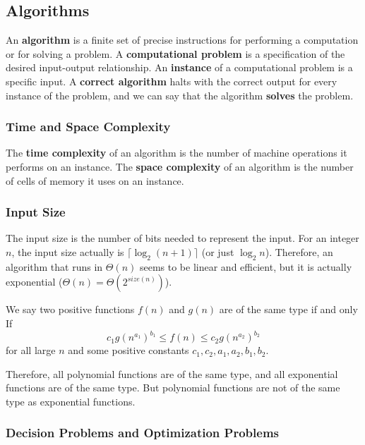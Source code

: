 \documentclass[a4paper,12pt]{article}
\begin{document}
\subsection{Algorithms}

An \textbf{algorithm} is a finite set of precise instructions for performing a computation or for solving a problem.
A \textbf{computational problem} is a specification of the desired input-output relationship.
An \textbf{instance} of a computational problem is a specific input.
A \textbf{correct algorithm} halts with the correct output for every instance of the problem, and we can say that the algorithm \textbf{solves} the problem.

\subsubsection{Time and Space Complexity}

The \textbf{time complexity} of an algorithm is the number of machine operations it performs on an instance.
The \textbf{space complexity} of an algorithm is the number of cells of memory it uses on an instance.

\subsubsection{Input Size}
The input size is the number of bits needed to represent the input.
For an integer $n$, the input size actually is $\lceil \log_2 (n+1) \rceil$ (or just $\log_2 n$).
Therefore, an algorithm that runs in $\Theta(n)$ seems to be linear and efficient, but it is actually exponential ($\Theta(n) = \Theta(2^{size(n)})$).

We say two positive functions $f(n)$ and $g(n)$ are of the same type if and only If
\begin{equation*}
	c_1 g(n^{a_1})^{b_1} \leq f(n) \leq c_2 g(n^{a_2})^{b_2}
\end{equation*}
for all large $n$ and some positive constants $c_1, c_2, a_1, a_2, b_1, b_2$.

Therefore, all polynomial functions are of the same type, and all exponential functions are of the same type.
But polynomial functions are not of the same type as exponential functions.

\subsubsection{Decision Problems and Optimization Problems}
\end{document}

